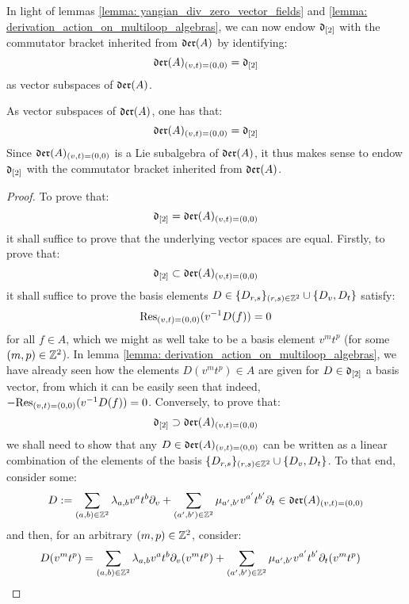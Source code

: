         In light of lemmas \ref{lemma: yangian_div_zero_vector_fields} and \ref{lemma: derivation_action_on_multiloop_algebras}, we can now endow $\d_{[2]}$ with the commutator bracket inherited from $\der(A)$ by identifying:
            $$\der(A)_{(v, t) = (0, 0)} = \d_{[2]}$$
        as vector subspaces of $\der(A)$.
        \begin{proposition} \label{prop: intrinsic_description_of_yangian_div_zero_vector_fields}
            As vector subspaces of $\der(A)$, one has that:
                $$\der(A)_{(v, t) = (0, 0)} = \d_{[2]}$$
            Since $\der(A)_{(v, t) = (0, 0)}$ is a Lie subalgebra of $\der(A)$, it thus makes sense to endow $\d_{[2]}$ with the commutator bracket inherited from $\der(A)$.
        \end{proposition}
            \begin{proof}
                To prove that:
                    $$\d_{[2]} = \der(A)_{(v, t) = (0, 0)}$$
                it shall suffice to prove that the underlying vector spaces are equal. Firstly, to prove that:
                    $$\d_{[2]} \subset \der(A)_{(v, t) = (0, 0)}$$
                it shall suffice to prove the basis elements $D \in \{D_{r, s}\}_{(r, s) \in \Z^2} \cup \{D_v, D_t\}$ satisfy:
                    $$\Res_{(v, t) = (0, 0)}( v^{-1} D(f) ) = 0$$
                for all $f \in A$, which we might as well take to be a basis element $v^m t^p$ (for some $(m, p) \in \Z^2$). In lemma \ref{lemma: derivation_action_on_multiloop_algebras}, we have already seen how the elements $D(v^m t^p) \in A$ are given for $D \in \d_{[2]}$ a basis vector, from which it can be easily seen that indeed, $-\Res_{(v, t) = (0, 0)}( v^{-1} D(f) ) = 0$. Conversely, to prove that:
                    $$\d_{[2]} \supset \der(A)_{(v, t) = (0, 0)}$$
                we shall need to show that any $D \in \der(A)_{(v, t) = (0, 0)}$ can be written as a linear combination of the elements of the basis $\{D_{r, s}\}_{(r, s) \in \Z^2} \cup \{D_v, D_t\}$. To that end, consider some:
                    $$D := \sum_{(a, b) \in \Z^2} \lambda_{a, b} v^a t^b \del_v + \sum_{(a', b') \in \Z^2} \mu_{a', b'} v^{a'} t^{b'} \del_t \in \der(A)_{(v, t) = (0, 0)}$$
                and then, for an arbitrary $(m, p) \in \Z^2$, consider:
                    $$
                        \begin{aligned}
                            D(v^m t^p) & = \sum_{(a, b) \in \Z^2} \lambda_{a, b} v^a t^b \del_v(v^m t^p) + \sum_{(a', b') \in \Z^2} \mu_{a', b'} v^{a'} t^{b'} \del_t(v^m t^p)

\end{aligned}$$
\end{proof}
